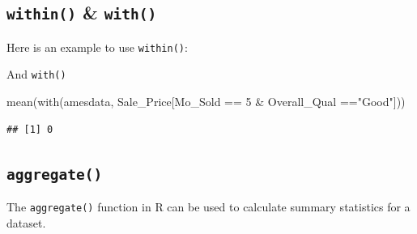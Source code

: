 \documentclass[
]{book}
\newenvironment{Shaded}{\begin{snugshade}}{\end{snugshade}}
\newcommand{\CommentTok}[1]{\textcolor[rgb]{0.56,0.35,0.01}{\textit{#1}}}
\newcommand{\DecValTok}[1]{\textcolor[rgb]{0.00,0.00,0.81}{#1}}
\newcommand{\FunctionTok}[1]{\textcolor[rgb]{0.00,0.00,0.00}{#1}}
\newcommand{\NormalTok}[1]{#1}
\newcommand{\OtherTok}[1]{\textcolor[rgb]{0.56,0.35,0.01}{#1}}
\newcommand{\SpecialCharTok}[1]{\textcolor[rgb]{0.00,0.00,0.00}{#1}}
\newcommand{\StringTok}[1]{\textcolor[rgb]{0.31,0.60,0.02}{#1}}
\begin{document}
\hypertarget{within-with}{%
\subsection{\texorpdfstring{\texttt{within()} \& \texttt{with()}}{within() \& with()}}\label{within-with}}

Here is an example to use \texttt{within()}:

\begin{Shaded}
\end{Shaded}

And \texttt{with()}

\begin{Shaded}
\begin{Highlighting}[]
\FunctionTok{mean}\NormalTok{(}\FunctionTok{with}\NormalTok{(amesdata, Sale\_Price[Mo\_Sold }\SpecialCharTok{==} \DecValTok{5}  \SpecialCharTok{\&}\NormalTok{  Overall\_Qual }\SpecialCharTok{==}\StringTok{"Good"}\NormalTok{]))}
\end{Highlighting}
\end{Shaded}

\begin{verbatim}
## [1] 0
\end{verbatim}

\hypertarget{aggregate}{%
\subsection{\texorpdfstring{\texttt{aggregate()}}{aggregate()}}\label{aggregate}}

The \texttt{aggregate()} function in R can be used to calculate summary statistics for a dataset.
\end{document}
